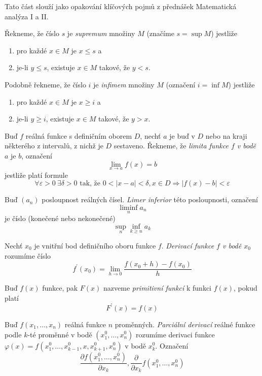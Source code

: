 Tato část slouží jako opakování klíčových pojmů z přednášek Matematická analýza I a II.

\begin{definice}
Řekneme, že číslo $s$ je \emph{supremum} množiny $M$ (značíme $s = \sup M$) jestliže
\begin{enumerate}
\item pro každé $x \in M$ je $x \leq s$ a
\item je-li $y \leq s$, existuje $x \in M$ takové, že $y < s$.
\end{enumerate}

Podobně řekneme, že číslo $i$ je \emph{infimem} množiny $M$ (označení $i = \inf M$) jestliže
\begin{enumerate}
\item pro každé $x \in M$ je $x \geq i$ a
\item je-li $y \geq i$, existuje $x \in M$ takové, že $y > x$.
\end{enumerate}
\end{definice}

\begin{definice}
Buď $f$ reálná funkce s definičním oborem $D$, nechť $a$ je buď v $D$ nebo na kraji některého z intervalů, z nichž je $D$ sestaveno. Řekneme, že \emph{limita funkce $f$ v bodě $a$} je $b$, označení
$$\lim_{x \to a} f(x) = b$$
jestliže platí formule
$$\forall \varepsilon > 0 \ \exists \delta > 0 \textrm{ tak, že } 0 < |x-a| < \delta, x \in D \Rightarrow |f(x) - b| < \varepsilon$$
\end{definice}

\begin{definice}
Buď $(a_n)$ posloupnost reálných čísel. \emph{Limer inferior} této posloupnosti, označení
$$\liminf_n a_n$$
je číslo (konečené nebo nekonečené)
$$\sup_n \inf_{k \geq n} a_k$$
\end{definice}


\begin{definice}
Nechť $x_0$ je vnitřní bod definičního oboru funkce $f$. \emph{Derivací funkce $f$ v bodě $x_0$} rozumíme číslo
$$f^\prime(x_0) = \lim_{h \to 0} \frac{f(x_0+h) - f(x_0)}{h}$$
\end{definice}

\begin{definice}
Buď $f(x)$ funkce, pak $F(x)$ nazveme \emph{primitivní funkcí} k funkci $f(x)$, pokud platí
$$F^\prime(x) = f(x)$$
\end{definice}

\begin{definice}
Buď $f(x_1, \ldots, x_n)$ reálná funkce $n$ proměnných. \emph{Parciální derivací} reálné funkce podle $k$-té proměnné v bodě $(x_1^0, \ldots, x_n^0)$ rozumíme derivaci funkce $\varphi(x) = f(x_1^0, \ldots, x_{k-1}^0, x, x_{k+1}^0, x_n^0)$ v bodě $x_k^0$. Označení
$$\frac{\partial f(x_1^0, \ldots, x_n^0)}{\partial x_k}, \frac{\partial}{\partial x_k} f(x_1^0, \ldots, x_n^0)$$
\end{definice}

